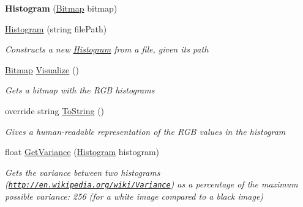 \begin{DoxyCompactItemize}
\item 
\hypertarget{class_proto_test_1_1_golem_1_1_web_driver_1_1_elements_1_1_images_1_1_histogram_ac2fdbcc1c150819d17ce40ffef68d464}{{\bfseries Histogram} (\hyperlink{class_proto_test_1_1_golem_1_1_web_driver_1_1_elements_1_1_images_1_1_histogram_af986fdc664c75a0de3285a9ab81cd558}{Bitmap} bitmap)}\label{class_proto_test_1_1_golem_1_1_web_driver_1_1_elements_1_1_images_1_1_histogram_ac2fdbcc1c150819d17ce40ffef68d464}

\item 
\hyperlink{class_proto_test_1_1_golem_1_1_web_driver_1_1_elements_1_1_images_1_1_histogram_a5e8bc43894807dcd6bc6921660353706}{Histogram} (string file\-Path)
\begin{DoxyCompactList}\small\item\em Constructs a new \hyperlink{class_proto_test_1_1_golem_1_1_web_driver_1_1_elements_1_1_images_1_1_histogram}{Histogram} from a file, given its path \end{DoxyCompactList}\item 
\hyperlink{class_proto_test_1_1_golem_1_1_web_driver_1_1_elements_1_1_images_1_1_histogram_af986fdc664c75a0de3285a9ab81cd558}{Bitmap} \hyperlink{class_proto_test_1_1_golem_1_1_web_driver_1_1_elements_1_1_images_1_1_histogram_af6c3452129843e9644fe9b35c72e8fc5}{Visualize} ()
\begin{DoxyCompactList}\small\item\em Gets a bitmap with the R\-G\-B histograms \end{DoxyCompactList}\item 
override string \hyperlink{class_proto_test_1_1_golem_1_1_web_driver_1_1_elements_1_1_images_1_1_histogram_a0e13921f2b5b2c35cf15dbf9d04ee7ce}{To\-String} ()
\begin{DoxyCompactList}\small\item\em Gives a human-\/readable representation of the R\-G\-B values in the histogram \end{DoxyCompactList}\item 
float \hyperlink{class_proto_test_1_1_golem_1_1_web_driver_1_1_elements_1_1_images_1_1_histogram_ad3576f6620debd499d1cab16e21d9a7a}{Get\-Variance} (\hyperlink{class_proto_test_1_1_golem_1_1_web_driver_1_1_elements_1_1_images_1_1_histogram}{Histogram} histogram)
\begin{DoxyCompactList}\small\item\em Gets the variance between two histograms (\href{http://en.wikipedia.org/wiki/Variance}{\tt http\-://en.\-wikipedia.\-org/wiki/\-Variance}) as a percentage of the maximum possible variance\-: 256 (for a white image compared to a black image) \end{DoxyCompactList}\end{DoxyCompactItemize}
